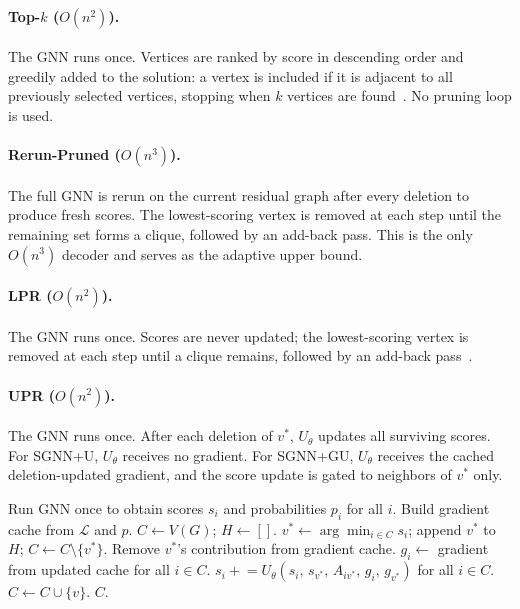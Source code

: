 \documentclass[11pt]{article}
\theoremstyle{plain}
\theoremstyle{remark}
\begin{document}
\paragraph{Top-$k$ ($O(n^2)$).}
The GNN runs once. Vertices are ranked by score in descending order and greedily
added to the solution: a vertex is included if it is adjacent to all previously
selected vertices, stopping when $k$ vertices are found~\citep{shoham2026ltr}.
No pruning loop is used.

\paragraph{Rerun-Pruned ($O(n^3)$).}
The full GNN is rerun on the current residual graph after every deletion to produce
fresh scores. The lowest-scoring vertex is removed at each step until the remaining
set forms a clique, followed by an add-back pass. This is the only $O(n^3)$ decoder
and serves as the adaptive upper bound.

\paragraph{LPR ($O(n^2)$).}
The GNN runs once. Scores are never updated; the lowest-scoring vertex is removed
at each step until a clique remains, followed by an add-back pass~\citep{shoham2026ltr}.

\paragraph{UPR ($O(n^2)$).}
The GNN runs once. After each deletion of $v^*$, $U_\theta$ updates all surviving
scores. For SGNN+U, $U_\theta$ receives no gradient. For SGNN+GU, $U_\theta$
receives the cached deletion-updated gradient, and the score update is gated to
neighbors of $v^*$ only.

\begin{algorithm}[t]
  \caption{UPR: Cached-Deletion Decoder}
  \label{alg:gub}
  \begin{algorithmic}[1]
    \State Run GNN once to obtain scores $s_i$ and probabilities $p_i$ for all $i$.
    \State Build gradient cache from $\mathcal{L}$ and $p$. \hfill{}
    \State $C \leftarrow V(G)$;\; $H \leftarrow []$.
    \State $v^* \leftarrow \arg\min_{i \in C} s_i$;\; append $v^*$ to $H$;\; $C \leftarrow C \setminus \{v^*\}$.
    \State Remove $v^*$'s contribution from gradient cache. \hfill{}
    \State $g_i \leftarrow$ gradient from updated cache for all $i \in C$. \hfill{}
    \State $s_i \mathrel{+}= U_\theta(s_i,\, s_{v^*},\, A_{iv^*},\, g_i,\, g_{v^*})$ for all $i \in C$. \hfill{}
    \EndWhile
     $C \leftarrow C \cup \{v\}$. \EndIf
    \EndFor
    \State \Return $C$.
  \end{algorithmic}
\end{algorithm}
\end{document}
